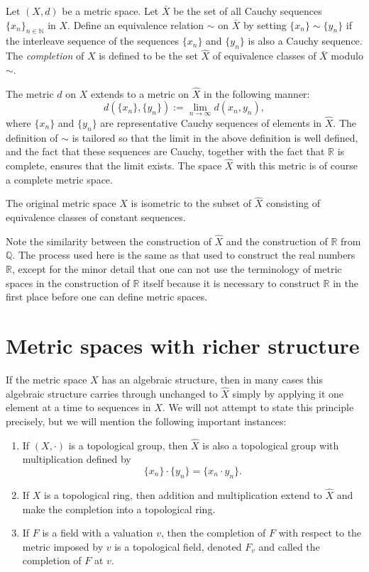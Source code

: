 \documentclass[12pt]{article}
\newcommand{\R}{\mathbb{R}}
\newcommand{\Q}{\mathbb{Q}}
\newcommand{\N}{\mathbb{N}}
\begin{document}
Let $(X,d)$ be a metric space. Let $\bar{X}$ be the set of all Cauchy
sequences $\{x_n\}_{n \in \N}$ in $X$. Define an equivalence relation
$\sim$ on $\bar{X}$ by setting $\{x_n\} \sim \{y_n\}$ if the
interleave sequence of the sequences $\{x_n\}$ and $\{y_n\}$ is also a
Cauchy sequence. The {\em completion} of $X$ is defined to be the set
$\hat{X}$ of equivalence classes of $\bar{X}$ modulo $\sim$.

The metric $d$ on $X$ extends to a metric on $\hat{X}$ in the
following manner:
$$
d(\{x_n\},\{y_n\}) := \lim_{n \to \infty} d(x_n,y_n),
$$
where $\{x_n\}$ and $\{y_n\}$ are representative Cauchy sequences of
elements in $\hat{X}$. The definition of $\sim$ is tailored so that
the limit in the above definition is well defined, and the fact that these
sequences are Cauchy, together with the fact that $\R$ is complete,
ensures that the limit exists. The space $\hat{X}$ with this metric is of course a complete metric space.

The original metric space $X$ is isometric to the subset of $\hat{X}$ consisting of equivalence classes of constant sequences.

Note the similarity between the construction of $\hat{X}$ and the
construction of $\R$ from $\Q$. The process used here is the same as
that used to construct the real numbers $\R$, except for the minor
detail that one can not use the terminology of metric spaces in the
construction of $\R$ itself because it is necessary to construct $\R$
in the first place before one can define metric spaces.

\section{Metric spaces with richer structure}

If the metric space $X$ has an algebraic structure, then in many
cases this algebraic structure carries through unchanged to $\hat{X}$
simply by applying it one element at a time to sequences in $X$. We
will not attempt to state this principle precisely, but we will
mention the following important instances:

\begin{enumerate}
\item If $(X,\cdot)$ is a topological group, then $\hat{X}$ is also a
  topological group with multiplication defined by
$$
\{x_n\} \cdot \{y_n\} = \{x_n \cdot y_n\}.
$$
\item If $X$ is a topological ring, then addition and multiplication
  extend to $\hat{X}$ and make the completion into a topological ring.
\item If $F$ is a field with a valuation $v$, then the completion of
  $F$ with respect to the metric imposed by $v$ is a topological
  field, denoted $F_v$ and called the completion of $F$ at $v$.
\end{enumerate}
\end{document}
